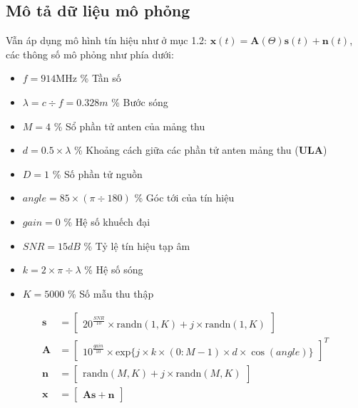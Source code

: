 \subsection{Mô tả dữ liệu mô phỏng}
Vẫn áp dụng mô hình tín hiệu như ở mục 1.2: $\mathbf{x}(t) = \mathbf{A}(\Theta)\mathbf{s}(t) + \mathbf{n}(t)$, các thông số mô phỏng như phía dưới:
{\renewcommand\labelitemi{}
\begin{itemize}
	\item $f = 914\textrm{MHz}$		\hspace{1.65cm}\% Tần số
	\item $\lambda = c \div f = 0.328 m$	\hspace{0.47cm}\% Bước sóng
	\item $M = 4$				\hspace{2.88cm}\% Sổ phần tử anten của mảng thu
	\item $d = 0.5 \times \lambda$		\hspace{2.2cm}\% Khoảng cách giữa các phần tử anten mảng thu (\textbf{ULA})
	\item $D = 1$				\hspace{2.92cm}\% Số phần tử nguồn
	\item $angle = 85 \times (\pi \div 180)$ \% Góc tới của tín hiệu
	\item $gain = 0$				\hspace{2.5cm}\% Hệ số khuếch đại
	\item $SNR = 15 dB$			\hspace{1.57cm}\% Tỷ lệ tín hiệu tạp âm
	\item $k = 2 \times \pi \div \lambda$	\hspace{1.56cm}\% Hệ số sóng
	\item $K = 5000$				\hspace{2.3cm}\% Số mẫu thu thập
\end{itemize}
\begin{subequations}
\label{eq:all}
\begin{align}
\label{eq:model_a}
    \mathbf{s} &=
    \begin{bmatrix}
   	20^{\frac{SNR}{10}}\times \mathrm{randn}(1, K) + j \times \mathrm{randn}(1, K)
    \end{bmatrix}\\
\label{eq:model_b}
    \mathbf{A} &=
    \begin{bmatrix}
	10^{\frac{gain}{10}} \times \mathrm{exp}\{j \times k \times (0:M-1) \times d \times \cos(angle)\}
    \end{bmatrix}^T \\
\label{eq:model_c}
 \mathbf{n} &=
    \begin{bmatrix}
	\mathrm{randn}(M, K) + j \times \mathrm{randn}(M, K)
    \end{bmatrix} \\
\label{eq:model_d}
 \mathbf{x} &=
    \begin{bmatrix}
	\mathbf{A}\mathbf{s} + \mathbf{n}
    \end{bmatrix}
\end{align}
\end{subequations}

}
